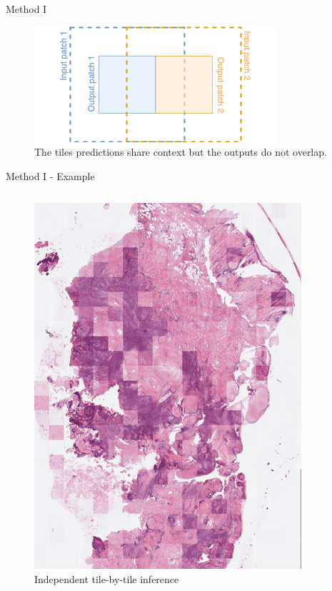 \documentclass[t]{beamer}
\begin{document}
\begin{frame}{Method I}
\begin{figure}
\centering
\includegraphics[width=0.3\linewidth]{no-overlap}
\caption{The tiles predictions share context but the outputs do not overlap.}
\end{figure}
\end{frame}

\begin{frame}{Method I - Example}

\begin{columns}

\begin{column}{0.5\textwidth}
\begin{figure}
\centering
\includegraphics[width=0.75\linewidth]{scan6-independent}
\caption{Independent tile-by-tile inference}
\end{figure}
\end{column}


\end{columns}
\end{frame}
\end{document}
